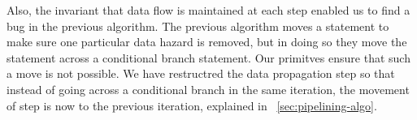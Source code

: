 Also, the invariant that data flow is maintained at each step enabled us to find a bug in the previous algorithm. The previous algorithm moves a statement to make sure one particular data hazard is removed, but in doing so they move the statement across a conditional branch statement. Our primitves ensure that such a move is not possible. We have restructred the data propagation step so that instead of going across a conditional branch in the same iteration, the movement of step is now to the previous iteration, explained in ~\ref{sec:pipelining-algo}. 




